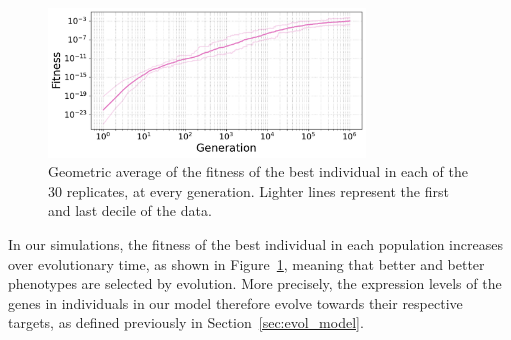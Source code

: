 \begin{figure}[H]
  \centering
  \hspace{-1.2cm}
  \includegraphics[width=0.75\textwidth]{ploscb/img/all_fitness.pdf}
  \caption{Geometric average of the fitness of the best individual in each of the 30 replicates, at every generation.
  Lighter lines represent the first and last decile of the data.}
  \label{fig:main_fitness}
\end{figure}

In our simulations, the fitness of the best individual in each population increases over evolutionary time, as shown in Figure~\ref{fig:main_fitness}, meaning that better and better phenotypes are selected by evolution. More precisely, the expression levels of the genes in individuals in our model therefore evolve towards their respective targets, as defined previously in Section~\ref{sec:evol_model}.

